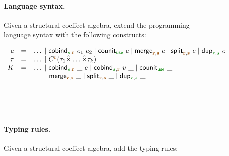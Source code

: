 \begin{figure}[t]
\paragraph{Language syntax.}
Given a structural coeffect algebra, extend the programming language syntax with the following
constructs:

\begin{equation*}
\begin{array}{rcl}
  e &  =  &\ldots \sep\ident{cobind}_{\cclrd{s},\aclrd{\textbf{r}}}~e_1~e_2 \sep \ident{counit}_{\cunit}~e \sep \ident{merge}_{\aclrd{\textbf{r}},\aclrd{\textbf{s}}}~e
         \sep \ident{split}_{\aclrd{\textbf{r}},\aclrd{\textbf{s}}}~e \sep \ident{dup}_{\cclrd{r},\cclrd{s}}~e \\
  \tau &  = &\ldots \sep \ctyp{\aclrd{\textbf{r}}}{(\tau_1 \xtimes \ldots \xtimes \tau_k)} \\
  K  & = &\ldots \sep \ident{cobind}_{\cclrd{s},\aclrd{\textbf{r}}}~\_~e \sep \ident{cobind}_{\cclrd{s},\aclrd{\textbf{r}}}~v~\_ \sep \ident{counit}_{\cunit}~\_ \\
    && \hspace{1.4em} \sep \ident{merge}_{\aclrd{\textbf{r}},\aclrd{\textbf{s}}}~\_
           \sep \ident{split}_{\aclrd{\textbf{r}},\aclrd{\textbf{s}}}~\_ \sep \ident{dup}_{\cclrd{r},\cclrd{s}}~\_ \\
\end{array}
\end{equation*}

~

~

\paragraph{Typing rules.}
Given a structural coeffect algebra, add the typing rules:


\end{figure}
